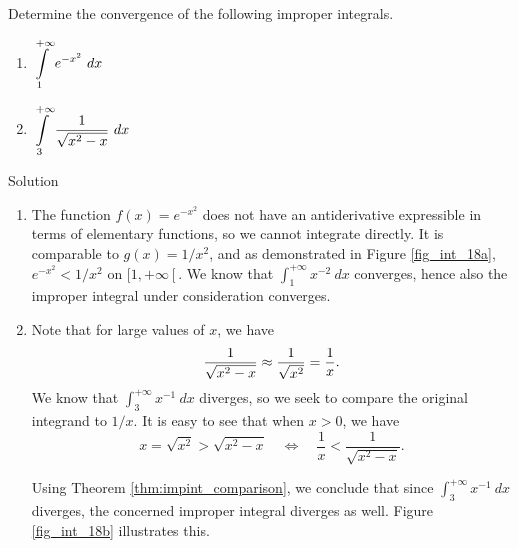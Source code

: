 \begin{example}\label{ex_impint5}
Determine the convergence of the following improper integrals.

\begin{multicols}{2}
\begin{enumerate}
\item $ \ds \int\limits_1^{+\infty} e^{-x^2}\ dx$
\item $\displaystyle \int\limits_3^{+\infty} \frac{1}{\sqrt{x^2-x}}\ dx$
\end{enumerate}
\end{multicols}

Solution 

\begin{enumerate}
\item		The function $f(x) = e^{-x^2}$ does not have an antiderivative expressible in terms of elementary functions, so we cannot integrate directly. It is comparable to $g(x)=1/x^2$, and as demonstrated in Figure \ref{fig_int_18a}, $e^{-x^2} < 1/x^2$ on $[1,+\infty\left[\right.$. We know that $ \int_1^{+\infty} x^{-2}\ dx$ converges, hence  also the improper integral under consideration converges.

\item		Note that for large values of $x$, we have
$$\displaystyle \frac{1}{\sqrt{x^2-x}} \approx \frac{1}{\sqrt{x^2}} =\frac{1}{x}.$$
We know that  $ \int_3^{+\infty} x^{-1}\ dx$ diverges, so we seek to compare the original integrand to $1/x$. It is easy to see that when $x>0$, we have  $$x = \sqrt{x^2} > \sqrt{x^2-x}\quad\Leftrightarrow\quad\frac1x < \frac1{\sqrt{x^2-x}}.$$

Using Theorem \ref{thm:impint_comparison}, we conclude that since $\int_3^{+\infty}x^{-1}\ dx$ diverges, the concerned improper integral diverges as well. Figure \ref{fig_int_18b} illustrates this.



\end{enumerate}
\end{example}
